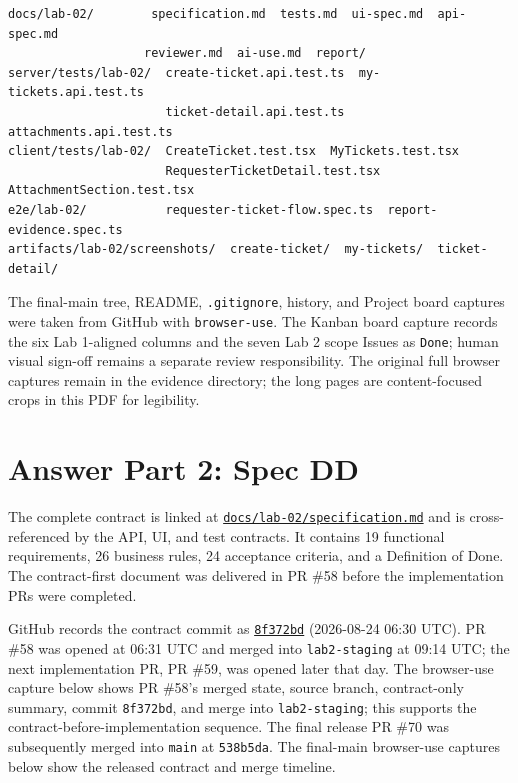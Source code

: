 \documentclass[10pt,a4paper]{article}
\begin{document}
\begin{verbatim}
docs/lab-02/        specification.md  tests.md  ui-spec.md  api-spec.md
                   reviewer.md  ai-use.md  report/
server/tests/lab-02/  create-ticket.api.test.ts  my-tickets.api.test.ts
                      ticket-detail.api.test.ts  attachments.api.test.ts
client/tests/lab-02/  CreateTicket.test.tsx  MyTickets.test.tsx
                      RequesterTicketDetail.test.tsx  AttachmentSection.test.tsx
e2e/lab-02/           requester-ticket-flow.spec.ts  report-evidence.spec.ts
artifacts/lab-02/screenshots/  create-ticket/  my-tickets/  ticket-detail/
\end{verbatim}

The final-main tree, README, \texttt{.gitignore}, history, and Project board
captures were taken from GitHub with \texttt{browser-use}. The Kanban board
capture records the six Lab 1-aligned columns and the seven Lab 2 scope Issues
as \texttt{Done}; human visual sign-off remains a separate review
responsibility. The original full
browser captures remain in the evidence directory; the long pages are
content-focused crops in this PDF for legibility.

\section{Answer Part 2: Spec DD}

The complete contract is linked at
\href{https://github.com/ovenmakemeheat/toktickit/blob/main/docs/lab-02/specification.md}{\texttt{docs/lab-02/specification.md}} and is cross-referenced by the
API, UI, and test contracts. It contains 19 functional requirements, 26
business rules, 24 acceptance criteria, and a Definition of Done. The
contract-first document was delivered in PR \#58 before the implementation PRs
were completed.

GitHub records the contract commit as
\href{https://github.com/ovenmakemeheat/toktickit/commit/8f372bd5f7dc687686b61273817c30e9ce24d14b}{\texttt{8f372bd}}
(2026-08-24 06:30 UTC). PR \#58 was opened at 06:31 UTC and merged into
\texttt{lab2-staging} at 09:14 UTC; the next implementation PR, PR \#59, was
opened later that day. The browser-use capture below shows PR \#58's merged
state, source branch, contract-only summary, commit \texttt{8f372bd}, and merge
into \texttt{lab2-staging}; this supports the contract-before-implementation
sequence. The final release PR \#70 was subsequently merged into
\texttt{main} at \texttt{538b5da}. The final-main browser-use captures below
show the released contract and merge timeline.
\end{document}
